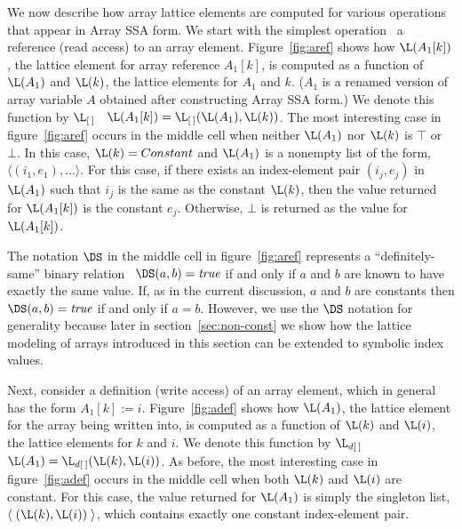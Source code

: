 We now describe how array lattice elements are computed for various
operations that appear in Array SSA form.  We start with the simplest operation
\viz\ a reference (read access) to an array element.
Figure~\ref{fig:aref} shows how $\L(A_1[k])$, the lattice element for array
reference $A_1[k]$, is computed as a function of $\L(A_1)$ and $\L(k)$, 
the lattice elements for $A_1$ and $k$.  ($A_1$ is a renamed version
of array variable $A$ obtained after constructing
Array SSA form.)
We denote this function
by $\L_{[\:]}$ \ie\ $\L(A_1[k]) = \L_{[\:]}(\L(A_1),\L(k))$.  
The most interesting case in figure~\ref{fig:aref} occurs
in the middle cell
when neither $\L(A_1)$ nor $\L(k)$ is $\top$ or $\bot$.
In this case, $\L(k) = Constant$ and $\L(A_1)$ is a nonempty list of the form,
$\langle (i_1,e_1), \ldots \rangle$.  For this case, if there exists
an index-element
pair $(i_j, e_j)$ in $\L(A_1)$ such that $i_j$ is the same as the constant
$\L(k)$, then the value returned for $\L(A_1[k])$ is the constant $e_j$.
Otherwise, $\bot$ is returned as the value for $\L(A_1[k])$.

The notation $\DS$ in the middle cell in figure~\ref{fig:aref}
represents a ``definitely-same'' binary relation \ie\ $\DS(a,b) =
\mbox{\it true}$ if and only if $a$ and $b$ are known to have exactly
the same value.  If, as in the current discussion, $a$ and $b$ are
constants then $\DS(a,b) = \mbox{\it true}$ if and only if $a=b$.
However, we use the $\DS$ notation for generality because later in
section~\ref{sec:non-const} we show how the lattice modeling of arrays
introduced in this section can be extended to symbolic index values.

Next, consider a definition (write access) of an array element, which 
in general has the form $A_1[k] := i$.
Figure~\ref{fig:adef} shows how $\L(A_1)$, the lattice element for 
the array being written into,
is computed as a function of $\L(k)$ and $\L(i)$, 
the lattice elements for $k$ and $i$.  We denote this function
by $\L_{d[\:]}$ \ie\ $\L(A_1) = \L_{d[\:]}(\L(k),\L(i))$.  
As before,
the most interesting case in figure~\ref{fig:adef} occurs
in the middle cell
when both $\L(k)$ and $\L(i)$ are constant.
For this case, the value returned for $\L(A_1)$ is simply 
the singleton list,
$\langle\;(\L(k),\L(i))\;\rangle$, which contains exactly
one constant index-element pair.


